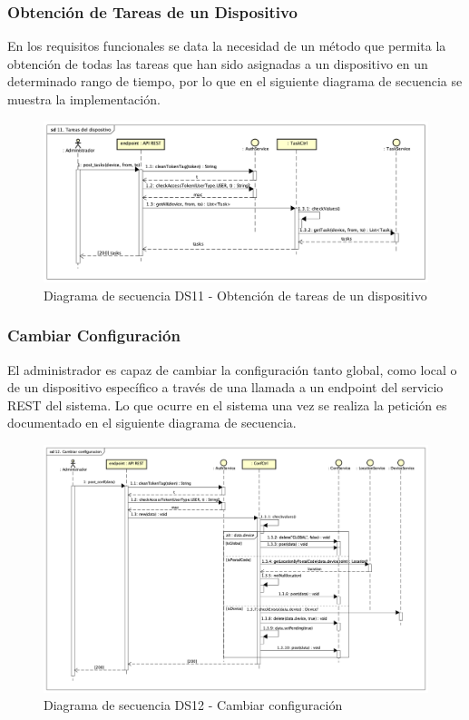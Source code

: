 \subsubsection{Obtención de Tareas de un Dispositivo}

En los requisitos funcionales se data la necesidad de un método que permita la obtención de todas las tareas que han sido asignadas a un dispositivo en un determinado rango de tiempo, por lo que en el siguiente diagrama de secuencia se muestra la implementación.

\begin{figure}[H]
    \centering
    \includegraphics[width=14cm]{./img/sequence/diagram/TareasDeDispositivo.png}
    \caption{Diagrama de secuencia DS11 - Obtención de tareas de un dispositivo}
    \label{fig:seq.getDeviceTasks}
\end{figure}

\newpage
\subsubsection{Cambiar Configuración}

El administrador es capaz de cambiar la configuración tanto global, como local o de un dispositivo específico a través de una llamada a un endpoint del servicio REST del sistema.
Lo que ocurre en el sistema una vez se realiza la petición es documentado en el siguiente diagrama de secuencia.

\begin{figure}[H]
    \centering
    \includegraphics[width=14cm]{./img/sequence/diagram/CambiarConfiguracion.png}
    \caption{Diagrama de secuencia DS12 - Cambiar configuración}
    \label{fig:seq.ChangeConf}
\end{figure}


